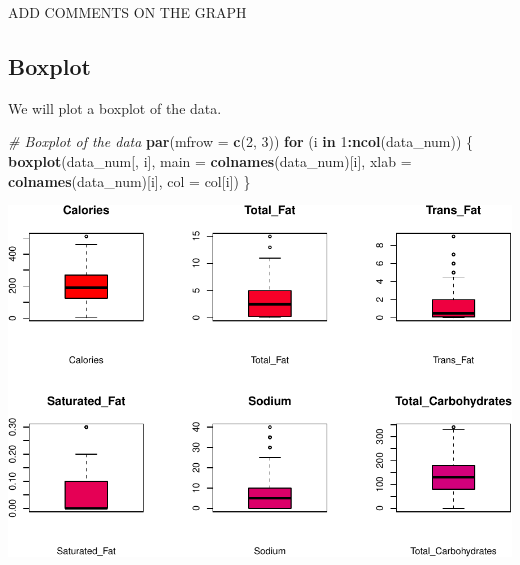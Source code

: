 \documentclass[
]{article}
\newenvironment{Shaded}{\begin{snugshade}}{\end{snugshade}}
\newcommand{\AttributeTok}[1]{\textcolor[rgb]{0.13,0.29,0.53}{#1}}
\newcommand{\CommentTok}[1]{\textcolor[rgb]{0.56,0.35,0.01}{\textit{#1}}}
\newcommand{\ControlFlowTok}[1]{\textcolor[rgb]{0.13,0.29,0.53}{\textbf{#1}}}
\newcommand{\DecValTok}[1]{\textcolor[rgb]{0.00,0.00,0.81}{#1}}
\newcommand{\FunctionTok}[1]{\textcolor[rgb]{0.13,0.29,0.53}{\textbf{#1}}}
\newcommand{\NormalTok}[1]{#1}
\newcommand{\SpecialCharTok}[1]{\textcolor[rgb]{0.81,0.36,0.00}{\textbf{#1}}}
\begin{document}
ADD COMMENTS ON THE GRAPH

\hypertarget{boxplot}{%
\subsection{Boxplot}\label{boxplot}}

We will plot a boxplot of the data.

\begin{Shaded}
\begin{Highlighting}[]
\CommentTok{\# Boxplot of the data}
\FunctionTok{par}\NormalTok{(}\AttributeTok{mfrow =} \FunctionTok{c}\NormalTok{(}\DecValTok{2}\NormalTok{, }\DecValTok{3}\NormalTok{))}
\ControlFlowTok{for}\NormalTok{ (i }\ControlFlowTok{in} \DecValTok{1}\SpecialCharTok{:}\FunctionTok{ncol}\NormalTok{(data\_num)) \{}
  \FunctionTok{boxplot}\NormalTok{(data\_num[, i], }\AttributeTok{main =} \FunctionTok{colnames}\NormalTok{(data\_num)[i],}
          \AttributeTok{xlab =} \FunctionTok{colnames}\NormalTok{(data\_num)[i], }\AttributeTok{col =}\NormalTok{ col[i])}
\NormalTok{\}}
\end{Highlighting}
\end{Shaded}

\begin{center}\includegraphics{Statistical_Learning_Final_Report_files/figure-latex/boxplot-1} \end{center}
\end{document}
